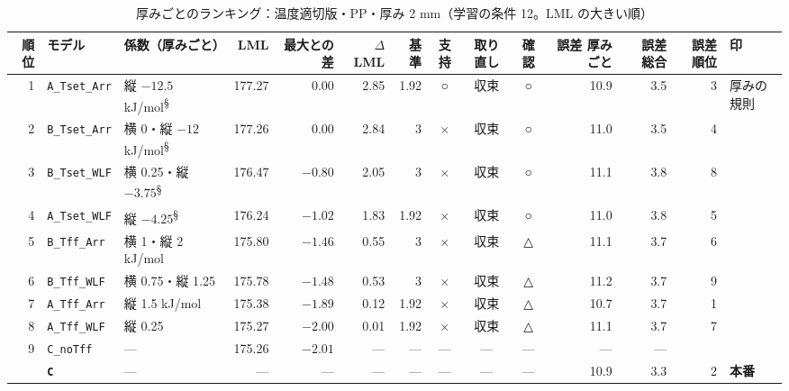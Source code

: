 \documentclass[paper=a4paper,landscape,fontsize=10pt,line_length=62zw,number_of_lines=34]{jlreq}
\let\origtextbf\textbf
\renewcommand{\textbf}[1]{\origtextbf{\gtfamily #1}}   %
\begin{document}
\begin{table}[H]\centering\footnotesize
\caption{厚みごとのランキング：温度適切版・PP・厚み 2 mm（学習の条件 12。LML の大きい順）}
\begin{tabular}{rlp{11\zw}rrrrccc rrrl}
\toprule
順位 & モデル & 係数（厚みごと） & LML & 最大との差 & $\Delta$LML & 基準 & 支持 & 取り直し & 確認 & 誤差 厚みごと & 誤差 総合 & 誤差順位 & 印 \\
\midrule
1 & \texttt{A\_\allowbreak{}Tset\_\allowbreak{}Arr} & 縦 $-12.5$ kJ/mol\textsuperscript{§} & 177.27 & 0.00 & 2.85 & 1.92 & ○ & 収束 & ○ & 10.9 & 3.5 & 3 & 厚みの規則 \\
2 & \texttt{B\_\allowbreak{}Tset\_\allowbreak{}Arr} & 横 0・縦 $-12$ kJ/mol\textsuperscript{§} & 177.26 & 0.00 & 2.84 & 3 & × & 収束 & ○ & 11.0 & 3.5 & 4 &  \\
3 & \texttt{B\_\allowbreak{}Tset\_\allowbreak{}WLF} & 横 0.25・縦 $-3.75$\textsuperscript{§} & 176.47 & $-0.80$ & 2.05 & 3 & × & 収束 & ○ & 11.1 & 3.8 & 8 &  \\
4 & \texttt{A\_\allowbreak{}Tset\_\allowbreak{}WLF} & 縦 $-4.25$\textsuperscript{§} & 176.24 & $-1.02$ & 1.83 & 1.92 & × & 収束 & ○ & 11.0 & 3.8 & 5 &  \\
5 & \texttt{B\_\allowbreak{}Tff\_\allowbreak{}Arr} & 横 1・縦 2 kJ/mol & 175.80 & $-1.46$ & 0.55 & 3 & × & 収束 & △ & 11.1 & 3.7 & 6 &  \\
6 & \texttt{B\_\allowbreak{}Tff\_\allowbreak{}WLF} & 横 0.75・縦 1.25 & 175.78 & $-1.48$ & 0.53 & 3 & × & 収束 & △ & 11.2 & 3.7 & 9 &  \\
7 & \texttt{A\_\allowbreak{}Tff\_\allowbreak{}Arr} & 縦 1.5 kJ/mol & 175.38 & $-1.89$ & 0.12 & 1.92 & × & 収束 & △ & 10.7 & 3.7 & 1 &  \\
8 & \texttt{A\_\allowbreak{}Tff\_\allowbreak{}WLF} & 縦 0.25 & 175.27 & $-2.00$ & 0.01 & 1.92 & × & 収束 & △ & 11.1 & 3.7 & 7 &  \\
9 & \texttt{C\_\allowbreak{}noTff} & --- & 175.26 & $-2.01$ & --- & --- & --- & --- & --- & --- & --- &  &  \\
 & \textbf{\texttt{C}} & --- & --- & --- & --- & --- & --- & --- & --- & 10.9 & 3.3 & 2 & \textbf{本番} \\
\bottomrule
\end{tabular}
\end{table}
\end{document}
